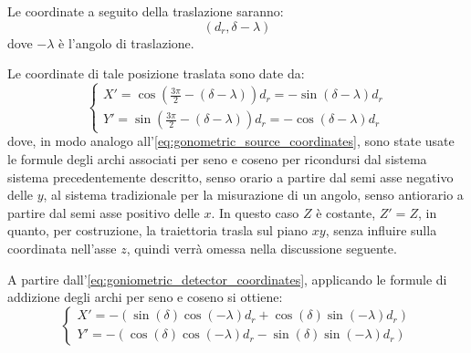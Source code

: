 \documentclass[12pt,a4paper]{report}
\begin{document}
Le coordinate a seguito della traslazione saranno:
\begin{equation*}
  (d_r, \delta - \lambda)
\end{equation*}
dove \(-\lambda\) è l'angolo di traslazione.

Le coordinate di tale posizione traslata sono date da:
\begin{equation} \label{eq:goniometric_detector_coordinates}
  \begin{cases}
    X' = \cos(\frac{3\pi}{2} - (\delta - \lambda)) d_r = -\sin(\delta - \lambda) d_r \\
    Y' = \sin(\frac{3\pi}{2} - (\delta - \lambda)) d_r = -\cos(\delta - \lambda) d_r
  \end{cases}
\end{equation}
dove, in modo analogo all'\autoref{eq:gonometric_source_coordinates}, sono state usate le formule degli archi associati per seno e
coseno per ricondursi dal sistema sistema precedentemente descritto, senso orario a partire dal semi asse negativo delle \(y\), al
sistema tradizionale per la misurazione di un angolo, senso antiorario a partire dal semi asse positivo delle \(x\).
In questo caso \(Z\) è costante, \(Z' = Z\), in quanto, per costruzione, la traiettoria trasla sul piano \(xy\), senza influire
sulla coordinata nell'asse \(z\), quindi verrà omessa nella discussione seguente.

A partire dall'\autoref{eq:goniometric_detector_coordinates}, applicando le formule di addizione degli archi per seno e coseno si
ottiene:
\begin{equation*}
  \begin{cases}
    X' = - (\sin(\delta)\cos(-\lambda) d_r + \cos(\delta)\sin(-\lambda) d_r) \\
    Y' = - (\cos(\delta)\cos(-\lambda) d_r - \sin(\delta)\sin(-\lambda) d_r)
  \end{cases}
\end{equation*}
\end{document}
